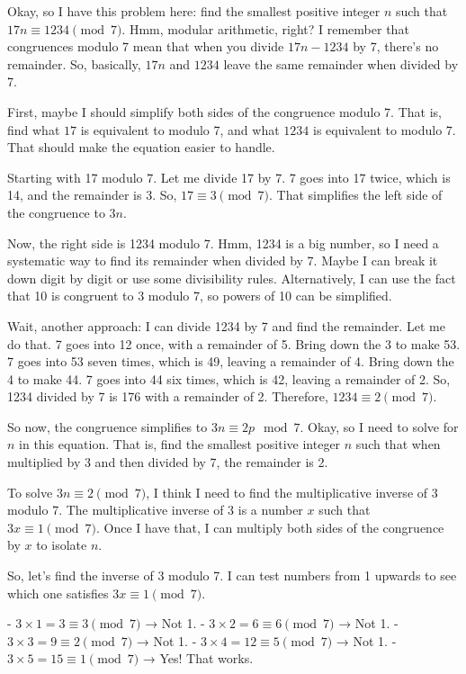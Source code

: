 \begin{tcolorbox}[modelbox, title=DeepSeek-R1-Distill-Qwen-1.5B]
Okay, so I have this problem here: find the smallest positive integer \( n \) such that \( 17n \equiv 1234 \pmod{7} \). Hmm, modular arithmetic, right? I remember that congruences modulo 7 mean that when you divide \( 17n - 1234 \) by 7, there's no remainder. So, basically, \( 17n \) and \( 1234 \) leave the same remainder when divided by 7. 

First, maybe I should simplify both sides of the congruence modulo 7. That is, find what \( 17 \) is equivalent to modulo 7, and what \( 1234 \) is equivalent to modulo 7. That should make the equation easier to handle.

Starting with 17 modulo 7. Let me divide 17 by 7. 7 goes into 17 twice, which is 14, and the remainder is 3. So, \( 17 \equiv 3 \pmod{7} \). That simplifies the left side of the congruence to \( 3n \).

Now, the right side is 1234 modulo 7. Hmm, 1234 is a big number, so I need a systematic way to find its remainder when divided by 7. Maybe I can break it down digit by digit or use some divisibility rules. Alternatively, I can use the fact that 10 is congruent to 3 modulo 7, so powers of 10 can be simplified.

Wait, another approach: I can divide 1234 by 7 and find the remainder. Let me do that. 7 goes into 12 once, with a remainder of 5. Bring down the 3 to make 53. 7 goes into 53 seven times, which is 49, leaving a remainder of 4. Bring down the 4 to make 44. 7 goes into 44 six times, which is 42, leaving a remainder of 2. So, 1234 divided by 7 is 176 with a remainder of 2. Therefore, \( 1234 \equiv 2 \pmod{7} \).

So now, the congruence simplifies to \( 3n \equiv 2p \mod{7} \). Okay, so I need to solve for \( n \) in this equation. That is, find the smallest positive integer \( n \) such that when multiplied by 3 and then divided by 7, the remainder is 2.

To solve \( 3n \equiv 2 \pmod{7} \), I think I need to find the multiplicative inverse of 3 modulo 7. The multiplicative inverse of 3 is a number \( x \) such that \( 3x \equiv 1 \pmod{7} \). Once I have that, I can multiply both sides of the congruence by \( x \) to isolate \( n \).

So, let's find the inverse of 3 modulo 7. I can test numbers from 1 upwards to see which one satisfies \( 3x \equiv 1 \pmod{7} \).

- \( 3 \times 1 = 3 \equiv 3 \pmod{7} \) → Not 1.
- \( 3 \times 2 = 6 \equiv 6 \pmod{7} \) → Not 1.
- \( 3 \times 3 = 9 \equiv 2 \pmod{7} \) → Not 1.
- \( 3 \times 4 = 12 \equiv 5 \pmod{7} \) → Not 1.
- \( 3 \times 5 = 15 \equiv 1 \pmod{7} \) → Yes! That works.


\end{tcolorbox}

